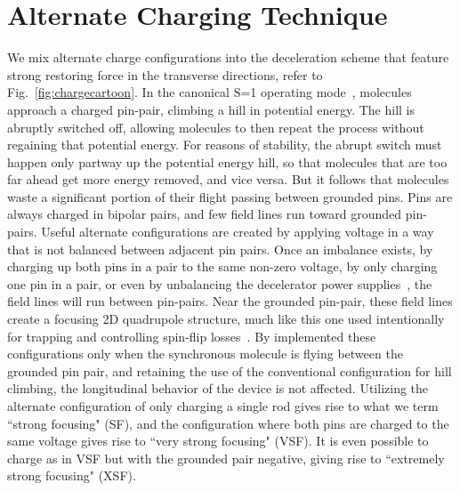 \documentclass[%
 reprint,
 amsmath,amssymb,
 aps,
prl,
]{revtex4-1}
\newcommand{\SO}{{S=1 }}
\begin{document}
\section{Alternate Charging Technique}
We mix alternate charge configurations into the deceleration scheme that feature strong restoring force in the transverse directions, refer to Fig.~\ref{fig:chargecartoon}.
In the canonical \SO operating mode~\cite{VanDeMeerakker2012}, molecules approach a charged pin-pair, climbing a hill in potential energy. 
The hill is abruptly switched off, allowing molecules to then repeat the process without regaining that potential energy.
For reasons of stability, the abrupt switch must happen only partway up the potential energy hill, so that molecules that are too far ahead get more energy removed, and vice versa. 
But it follows that molecules waste a significant portion of their flight passing between grounded pins.
Pins are always charged in bipolar pairs, and few field lines run toward grounded pin-pairs. 
Useful alternate configurations are created by applying voltage in a way that is not balanced between adjacent pin pairs. 
Once an imbalance exists, by charging up both pins in a pair to the same non-zero voltage, by only charging one pin in a pair, or even by unbalancing the decelerator power supplies~\cite{Hoekstra2018}, the field lines will run between pin-pairs. 
Near the grounded pin-pair, these field lines create a focusing 2D quadrupole structure, much like this one used intentionally for trapping and controlling spin-flip losses~\cite{Reens2017}. 
By implemented these configurations only when the synchronous molecule is flying between the grounded pin pair, and retaining the use of the conventional configuration for hill climbing, the longitudinal behavior of the device is not affected.
Utilizing the alternate configuration of only charging a single rod gives rise to what we term ``strong focusing" (SF), and the configuration where both pins are charged to the same voltage gives rise to ``very strong focusing" (VSF). 
It is even possible to charge as in VSF but with the grounded pair negative, giving rise to ``extremely strong focusing" (XSF).
\end{document}
